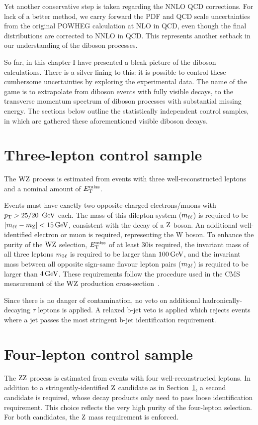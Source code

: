 Yet another conservative step is taken regarding the NNLO QCD corrections.
For lack of a better method, we carry forward the PDF and QCD scale uncertainties from the original POWHEG calculation at NLO in QCD,
even though the final distributions are corrected to NNLO in QCD.
This represents another setback in our understanding of the diboson processes.

So far, in this chapter I have presented a bleak picture of the diboson calculations.
There is a silver lining to this: it is possible to control these cumbersome uncertainties by exploring the experimental data.
The name of the game is to extrapolate from diboson events with fully visible decays, to the transverse momentum spectrum of diboson processes with substantial missing energy. 
The sections below outline the statistically independent control samples, in which are gathered these aforementioned visible diboson decays.

\section{Three-lepton control sample}
\label{sec:wz3l}
The $\mathrm{W}\mathrm{Z}$ process is estimated from events with three well-reconstructed leptons and a nominal amount of $E_\mathrm{T}^{\mathrm{miss}}$.

Events must have exactly two opposite-charged electrons/muons with $p_{\mathrm{T}} > 25/20~\,\text{Ge\hspace{-.08em}V}$ each.
The mass of this dilepton system ($m_{\ell\ell}$) is required to be $\left|m_{\ell\ell}-m_{\mathrm{Z}}\right| < 15\,\text{Ge\hspace{-.08em}V}$, consistent with the decay of a $\mathrm{Z}$ boson.
An additional well-identified electron or muon is required, representing the W boson.
To enhance the purity of the $\mathrm{W}\mathrm{Z}$ selection, $E_\mathrm{T}^{\mathrm{miss}}$ of at least 30\GeV is required,
the invariant mass of all three leptons $m_{3\ell}$ is required to be larger than $100\,\text{Ge\hspace{-.08em}V}$,
and the invariant mass between all opposite sign-same flavour lepton pairs ($m_{2\ell}$) is required to be larger than $4\,\text{Ge\hspace{-.08em}V}$.
These requirements follow the procedure used in the CMS measurement of the $\mathrm{W}\mathrm{Z}$ production cross-section~\cite{Khachatryan:2016tgp}.

Since there is no danger of contamination, no veto on additional hadronically-decaying $\tau$ leptons is applied.
A relaxed b-jet veto is applied which rejects events where a jet passes the most stringent b-jet identification requirement.

\section{Four-lepton control sample}
\label{sec:zz4l}
The $\mathrm{Z}\mathrm{Z}$ process is estimated from events with four well-reconstructed leptons.
In addition to a stringently-identified $\mathrm{Z}$ candidate as in Section~\ref{sec:wz3l}, 
a second candidate is required, whose decay products only need to pass loose identification requirement.
This choice reflects the very high purity of the four-lepton selection. 
For both candidates, the $\mathrm{Z}$ mass requirement is enforced.

